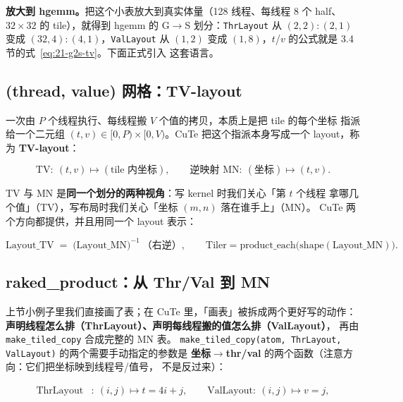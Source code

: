 \textbf{放大到 hgemm。}把这个小表放大到真实体量（128 线程、每线程 8 个
half、$32\times32$ 的 tile），就得到 hgemm 的 G$\to$S 划分：\texttt{ThrLayout}
从 $(2,2){:}(2,1)$ 变成 $(32,4){:}(4,1)$，\texttt{ValLayout} 从 $(1,2)$ 变成
$(1,8)$，$t$/$v$ 的公式就是 3.4 节的式~\eqref{eq:21-g2s-tv}。下面正式引入
这套语言。

\subsection{(thread, value) 网格：TV-layout}

一次由 $P$ 个线程执行、每线程搬 $V$ 个值的拷贝，本质上是把 tile 的每个坐标
指派给一个二元组 $(t,v)\in[0,P)\times[0,V)$。CuTe 把这个指派本身写成一个
layout，称为 \textbf{TV-layout}：

\begin{equation}
  \mathrm{TV}:\ (t,v) \longmapsto (\text{tile 内坐标}), \qquad
  \text{逆映射 } \mathrm{MN}:\ (\text{坐标}) \longmapsto (t,v) .
  \label{eq:21-tv}
\end{equation}

TV 与 MN 是\textbf{同一个划分的两种视角}：写 kernel 时我们关心「第 $t$ 个线程
拿哪几个值」（TV），写布局时我们关心「坐标 $(m,n)$ 落在谁手上」（MN）。
CuTe 两个方向都提供，并且用同一个 layout 表示：

\begin{equation}
  \mathrm{Layout\_TV} \;=\; \bigl(\mathrm{Layout\_MN}\bigr)^{-1}
  \ \text{（右逆）}, \qquad
  \mathrm{Tiler} = \mathrm{product\_each}\bigl(\mathrm{shape}(\mathrm{Layout\_MN})\bigr) .
  \label{eq:21-mn-tv}
\end{equation}

\subsection{raked\_product：从 Thr/Val 到 MN}

上节小例子里我们直接画了表；在 CuTe 里，「画表」被拆成两个更好写的动作：
\textbf{声明线程怎么排（ThrLayout）、声明每线程搬的值怎么排（ValLayout）}，
再由 \texttt{make\_\allowbreak{}tiled\_\allowbreak{}copy} 合成完整的 MN 表。
\texttt{make\_\allowbreak{}tiled\_\allowbreak{}copy\allowbreak{}(atom,\allowbreak{} Thr\allowbreak{}Layout,\allowbreak{} Val\allowbreak{}Layout)} 的两个需要手动指定的参数是
\textbf{坐标$\to$thr/val} 的两个函数（注意方向：它们把坐标映到线程号/值号，
不是反过来）：

\begin{align}
  \mathrm{ThrLayout}&:\ (i,j) \longmapsto t = 4i + j, \qquad
  \mathrm{ValLayout}:\ (i,j) \longmapsto v = j , \label{eq:21-g2s-params}
\end{align}

